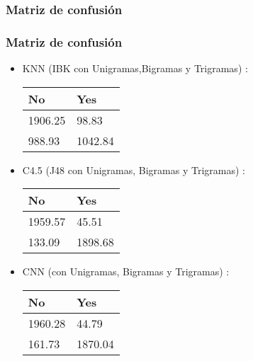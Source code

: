 \documentclass{beamer}
\newcommand\Fontvi{\fontsize{10}{7.2}\selectfont}
\begin{document}
\subsubsection{Matriz de confusi\'{o}n}
\begin{frame}
\frametitle{Matriz de confusi\'{o}n}
\Fontvi
\begin{itemize}
\item KNN (IBK con Unigramas,Bigramas y Trigramas) : 

\begin{table}
\begin{center}
\begin{tabular}{ | p{2 cm} | p{2 cm} | }
\toprule
\textbf{No} & \textbf{Yes}\\
\midrule
1906.25 & 98.83\\ \hline
988.93 & 1042.84\\ \hline
\bottomrule
\end{tabular}
\end{center}
\end{table}

\item C4.5 (J48 con Unigramas, Bigramas y Trigramas) : 

\begin{table}
\begin{center}
\begin{tabular}{ | p{2 cm} | p{2 cm} | }
\toprule
\textbf{No} & \textbf{Yes}\\
\midrule
1959.57 & 45.51\\ \hline
133.09 & 1898.68\\ \hline
\bottomrule
\end{tabular}
\end{center}
\end{table}

\item CNN (con Unigramas, Bigramas y Trigramas) : 

\begin{table}
\begin{center}
\begin{tabular}{ | p{2 cm} | p{2 cm} | }
\toprule
\textbf{No} & \textbf{Yes}\\
\midrule
1960.28 & 44.79\\ \hline
161.73 & 1870.04\\ \hline
\bottomrule
\end{tabular}
\end{center}
\end{table}

\end{itemize}
\end{frame}
\end{document}
